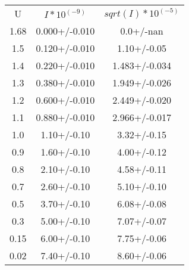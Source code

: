 \begin{table}
\begin{tabular}{ccc}
U & $I*10^(-9)$ & $sqrt(I)*10^(-5)$ \\
1.68 & 0.000+/-0.010 & 0.0+/-nan \\
1.5 & 0.120+/-0.010 & 1.10+/-0.05 \\
1.4 & 0.220+/-0.010 & 1.483+/-0.034 \\
1.3 & 0.380+/-0.010 & 1.949+/-0.026 \\
1.2 & 0.600+/-0.010 & 2.449+/-0.020 \\
1.1 & 0.880+/-0.010 & 2.966+/-0.017 \\
1.0 & 1.10+/-0.10 & 3.32+/-0.15 \\
0.9 & 1.60+/-0.10 & 4.00+/-0.12 \\
0.8 & 2.10+/-0.10 & 4.58+/-0.11 \\
0.7 & 2.60+/-0.10 & 5.10+/-0.10 \\
0.5 & 3.70+/-0.10 & 6.08+/-0.08 \\
0.3 & 5.00+/-0.10 & 7.07+/-0.07 \\
0.15 & 6.00+/-0.10 & 7.75+/-0.06 \\
0.02 & 7.40+/-0.10 & 8.60+/-0.06 \\
\end{tabular}
\end{table}
